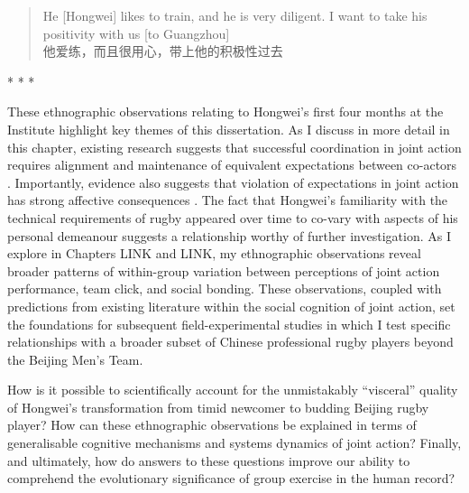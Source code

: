 \begin{CJK}{UTF8}{gbsn}
  \begin{quotation}
He [Hongwei] likes to train, and he is very diligent. I want to take his positivity with us [to Guangzhou] \\
他爱练，而且很用心，带上他的积极性过去
  \end{quotation}


                          \begin{center}
                            * * *
                          \end{center}


These ethnographic observations relating to Hongwei's first four months at the Institute highlight key themes of this dissertation.  As I discuss in more detail in this chapter, existing research suggests that successful coordination in joint action requires alignment and maintenance of equivalent expectations between co-actors \citep{Sebanz2006,Vesper2017,Pesquita2017}.  Importantly, evidence also suggests that violation of expectations in joint action has strong affective consequences \citep{Chetverikov2016}.  The fact that Hongwei's familiarity with the technical requirements of rugby appeared over time to co-vary with aspects of his personal demeanour suggests a relationship worthy of further investigation.  As I explore in Chapters LINK and LINK, my ethnographic observations reveal broader patterns of within-group variation between perceptions of joint action performance, team click, and social bonding.  These observations, coupled with predictions from existing literature within the social cognition of joint action, set the foundations for subsequent field-experimental studies in which I test specific relationships with a broader subset of Chinese professional rugby players beyond the Beijing Men's Team.

How is it possible to scientifically account for the unmistakably ``visceral'' quality of Hongwei's transformation from timid newcomer to budding Beijing rugby player?  How can these ethnographic observations be explained in terms of generalisable cognitive mechanisms and systems dynamics of joint action?  Finally, and ultimately, how do answers to these questions improve our ability to comprehend the evolutionary significance of group exercise in the human record?















\end{CJK}
